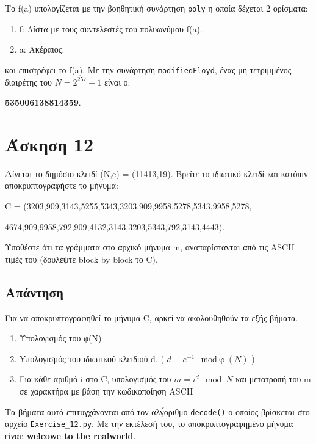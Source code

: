 \documentclass[12pt]{article}
\begin{document}
Το f(a) υπολογίζεται με την βοηθητική συνάρτηση \texttt{poly} η οποία δέχεται 2 ορίσματα: 
\begin{enumerate}
    \item f: Λίστα με τους συντελεστές του πολυωνύμου f(a).
    \item a: Ακέραιος.
\end{enumerate} 
και επιστρέφει το f(a).
\newline
\newline
Με την συνάρτηση \texttt{modifiedFloyd}, ένας μη τετριμμένος διαιρέτης του 
\( N = 2^{257} - 1 \)  είναι ο: 
\begin{center}
    \textbf{535006138814359}.
\end{center}
\hfill \blacksquare

\section*{Άσκηση 12}

Δίνεται το δημόσιο κλειδί (N,e) = (11413,19). Βρείτε το ιδιωτικό κλειδί και κατόπιν αποκρυπτογραφήστε το μήνυμα:

\begin{center}
    C = (3203,909,3143,5255,5343,3203,909,9958,5278,5343,9958,5278,
    
     4674,909,9958,792,909,4132,3143,3203,5343,792,3143,4443).
\end{center}
Υποθέστε ότι τα γράμματα στο αρχικό μήνυμα m, αναπαρίστανται από τις ASCII τιμές του (δουλέψτε block by block το C).
\subsection*{Απάντηση}
Για να αποκρυπτογραφηθεί το μήνυμα C, αρκεί να ακολουθηθούν τα εξής βήματα.
\begin{enumerate}
    \item Υπολογισμός του φ(Ν)
    \item Yπολογισμός του ιδιωτικού κλειδιού d. ( \( d \equiv e^{-1} \mod \text{φ}(N) \) )
    \item Για κάθε αριθμό i στο C, υπολογισμός του \( m = i^d \mod N \) και μετατροπή του m σε χαρακτήρα με βάση την κωδικοποίηση ASCII
\end{enumerate}
Τα βήματα αυτά επιτυγχάνονται από τον αλγ́οριθμο \texttt{decode()} ο οποίος βρίσκεται στο αρχείο \texttt{Exercise\_12.py}.
\newline
\newline
Με την εκτέλεσή του, το αποκρυπτογραφημένο μήνυμα είναι: \textbf{welcowe to the realworld}.
\end{document}
